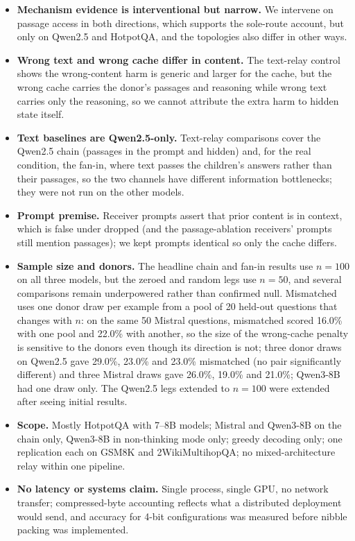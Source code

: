 \documentclass[11pt]{article}
\begin{document}
\begin{itemize}[leftmargin=*,itemsep=1pt]
\item \textbf{Mechanism evidence is interventional but narrow.} We intervene on
passage access in both directions, which supports the sole-route account, but
only on Qwen2.5 and HotpotQA, and the topologies also differ in other ways.
\item \textbf{Wrong text and wrong cache differ in content.} The text-relay
control shows the wrong-content harm is generic and larger for the cache, but the
wrong cache carries the donor's passages and reasoning while wrong text carries
only the reasoning, so we cannot attribute the extra harm to hidden state itself.
\item \textbf{Text baselines are Qwen2.5-only.} Text-relay comparisons cover the
Qwen2.5 chain (passages in the prompt and hidden) and, for the real condition, the
fan-in, where text passes the
children's answers rather than their passages, so the two channels have different
information bottlenecks; they were not run on the other models.
\item \textbf{Prompt premise.} Receiver prompts assert that prior content
is in context, which is false under dropped (and the passage-ablation
receivers' prompts still mention passages); we kept prompts identical so only
the cache differs.
\item \textbf{Sample size and donors.} The headline chain and fan-in results use
$n{=}100$ on all three models, but the zeroed and random legs use $n{=}50$, and
several comparisons remain underpowered rather than confirmed null.
Mismatched uses one donor draw per example from a pool of 20 held-out questions
that changes with $n$: on the same 50 Mistral questions, mismatched scored 16.0\%
with one pool and 22.0\% with another, so the size of the wrong-cache penalty is
sensitive to the donors even though its direction is not; three donor draws on
Qwen2.5 gave 29.0\%, 23.0\% and 23.0\% mismatched (no pair significantly
different) and three Mistral draws gave 26.0\%, 19.0\% and 21.0\%; Qwen3-8B had
one draw only. The Qwen2.5 legs extended
to $n{=}100$ were extended after seeing initial results.
\item \textbf{Scope.} Mostly HotpotQA with 7--8B models; Mistral and
Qwen3-8B on the chain only, Qwen3-8B in non-thinking mode only; greedy
decoding only; one replication each on GSM8K and 2WikiMultihopQA; no
mixed-architecture relay within one pipeline.
\item \textbf{No latency or systems claim.} Single process, single GPU, no
network transfer; compressed-byte accounting reflects what a distributed
deployment would send, and accuracy for 4-bit configurations was measured
before nibble packing was implemented.
\end{itemize}
\end{document}
